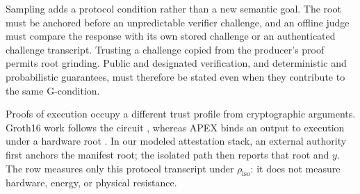 Sampling adds a protocol condition rather than a new semantic goal. The root
must be anchored before an unpredictable verifier challenge, and an offline
judge must compare the response with its own stored challenge or an
authenticated challenge transcript. Trusting a challenge copied from the
producer's proof permits root grinding. Public and designated verification,
and deterministic and probabilistic guarantees, must therefore be stated even
when they contribute to the same G-condition.

Proofs of execution occupy a different trust profile from cryptographic
arguments. Groth16 work follows the circuit \cite{groth2016}, whereas APEX binds
an output to execution under a hardware root \cite{apex2020}. In our modeled
attestation stack, an external authority first anchors the manifest root; the
isolated path then reports that root and $y$. The row measures only this
protocol transcript under $\rho_{\mathrm{iso}}$: it does not measure hardware,
energy, or physical resistance.

